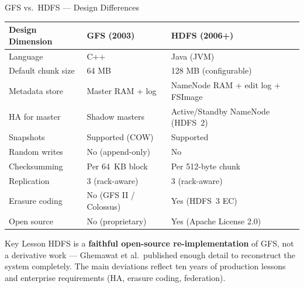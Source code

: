 \documentclass[aspectratio=169,10pt]{beamer}
\begin{document}
\begin{frame}{GFS vs.\ HDFS — Design Differences}
  \begin{center}
  \renewcommand{\arraystretch}{1.3}
  \begin{tabular}{@{}lll@{}}
    \toprule
    \textbf{Design Dimension} & \textbf{GFS (2003)} & \textbf{HDFS (2006+)} \\
    \midrule
    Language          & C++               & Java (JVM) \\
    Default chunk size& 64 MB             & 128 MB (configurable) \\
    Metadata store    & Master RAM + log  & NameNode RAM + edit log + FSImage \\
    HA for master     & Shadow masters    & Active/Standby NameNode (HDFS~2) \\
    Snapshots         & Supported (COW)   & Supported \\
    Random writes     & No (append-only)  & No \\
    Checksumming      & Per 64~KB block   & Per 512-byte chunk \\
    Replication       & 3 (rack-aware)    & 3 (rack-aware) \\
    Erasure coding    & No (GFS II / Colossus) & Yes (HDFS~3 EC) \\
    Open source       & No (proprietary)  & Yes (Apache License 2.0) \\
    \bottomrule
  \end{tabular}
  \end{center}
  \vspace{5pt}
  \begin{alertblock}{Key Lesson}
    HDFS is a \textbf{faithful open-source re-implementation} of GFS,
    not a derivative work — Ghemawat et al.\ published enough detail
    to reconstruct the system completely.
    The main deviations reflect ten years of production lessons
    and enterprise requirements (HA, erasure coding, federation).
  \end{alertblock}
\end{frame}
\end{document}
